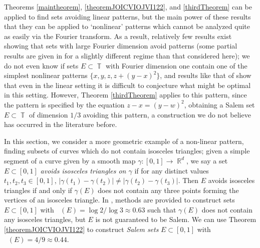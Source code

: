 \documentclass[dvipsnames,letterpaper,12pt]{article}
\numberwithin{equation}{section}
\DeclareMathOperator{\hausdim}{\dim_{\mathbb{H}}}
\DeclareMathOperator{\fordim}{\dim_{\mathbb{F}}}
\DeclareMathOperator{\RR}{\mathbb{R}}
\DeclareMathOperator{\TT}{\mathbb{T}}
\numberwithin{theorem}{section}
\begin{document}
Theorems \ref{maintheorem}, \ref{theoremJOICVIOJVI122}, and \ref{thirdTheorem} can be applied to find sets avoiding linear patterns, but the main power of these results that they can be applied to `nonlinear' patterns which cannot be analyzed quite as easily via the Fourier transform. As a result, relatively few results exist showing that sets with large Fourier dimension avoid patterns (some partial results are given in \cite{HenriotLabaPramanik} for a slightly different regime than that considered here); we do not even know if sets $E \subset \TT$ with Fourier dimension one contain one of the simplest nonlinear patterns $\{ x, y, z, z + (y - x)^2 \}$, and results like that of \cite{Schmerkin} show that even in the linear setting it is difficult to conjecture what might be optimal in this setting. However, Theorem \ref{thirdTheorem} applies to this pattern, since the pattern is specified by the equation $z - x = (y - w)^2$, obtaining a Salem set $E \subset \TT$ of dimension $1/3$ avoiding this pattern, a construction we do not believe has occurred in the literature before.

In this section, we consider a more geometric example of a non-linear pattern, finding subsets of curves which do not contain isosceles triangles; given a simple segment of a curve given by a smooth map $\gamma : [0,1] \to \RR^d$, we say a set $E \subset [0,1]$ \emph{avoids isosceles triangles on $\gamma$} if for any distinct values $t_1,t_2,t_3 \in [0,1]$, $|\gamma(t_1) - \gamma(t_2)| \neq |\gamma(t_2) - \gamma(t_3)|$. Then $E$ avoids isosceles triangles if and only if $\gamma(E)$ does not contain any three points forming the vertices of an  isosceles triangle. In \cite{PramanikFraser}, methods are provided to construct sets $E \subset [0,1]$ with $\hausdim(E) = \log 2 / \log 3 \approx 0.63$ such that $\gamma(E)$ does not contain any isosceles triangles, but $E$ is not guaranteed to be Salem. We can use Theorem \ref{theoremJOICVIOJVI122} to construct \emph{Salem sets} $E \subset [0,1]$ with $\fordim(E) = 4/9 \approx 0.44$.
\end{document}
